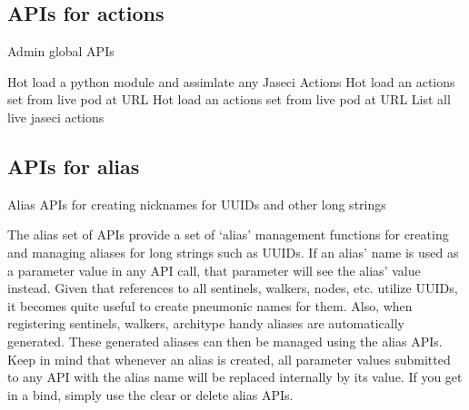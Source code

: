 \subsection{APIs for actions}

Admin global APIs

{Hot load a python module and assimlate any Jaseci Actions}
{Hot load an actions set from live pod at URL}
{Hot load an actions set from live pod at URL}
{List all live jaseci actions}
\subsection{APIs for alias}

Alias APIs for creating nicknames for UUIDs and other long strings
\par
The alias set of APIs provide a set of `alias' management functions for
creating and managing aliases for long strings such as UUIDs. If an alias'
name is used as a parameter value in any API call, that parameter will see
the alias' value instead. Given that references to all sentinels, walkers,
nodes, etc. utilize UUIDs, it becomes quite useful to create pneumonic
names for them. Also, when registering   sentinels, walkers, architype
handy aliases are automatically generated. These generated aliases can
then be managed using the alias APIs. Keep in mind that whenever an alias
is created, all parameter values submitted to any API with the alias name
will be replaced internally by its value. If you get in a bind, simply use
the clear or delete alias APIs.

